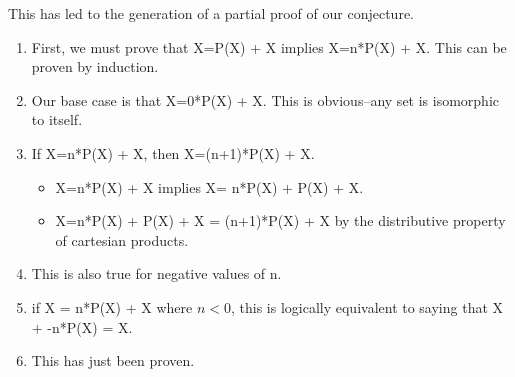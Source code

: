 \documentclass[letterpaper,numbers=enddot]{scrartcl}
\begin{document}
  This has led to the generation of a partial proof of our conjecture.

  \begin{enumerate}
    \item First, we must prove that X=P(X) + X implies X=n*P(X) + X.
          This can be proven by induction.

    \item Our base case is that X=0*P(X) + X.  This is obvious--any set
          is isomorphic to itself.

    \item If X=n*P(X) + X, then X=(n+1)*P(X) + X.
    \begin{itemize}
      \item X=n*P(X) + X implies X= n*P(X) + P(X) + X.

      \item X=n*P(X) + P(X) + X = (n+1)*P(X) + X by the distributive property of cartesian products.
    \end{itemize}

    \item This is also true for negative values of n.

    \item if X = n*P(X) + X where $n < 0$, this is logically equivalent
    to saying that X + -n*P(X) = X.

    \item This has just been proven.

  \end{enumerate}
\end{document}

